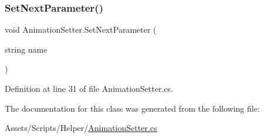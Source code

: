 \subsubsection{\texorpdfstring{Set\+Next\+Parameter()}{SetNextParameter()}}
{\footnotesize\ttfamily void Animation\+Setter.\+Set\+Next\+Parameter (\begin{DoxyParamCaption}\item[{string}]{name }\end{DoxyParamCaption})}



Definition at line 31 of file Animation\+Setter.\+cs.



The documentation for this class was generated from the following file\+:\begin{DoxyCompactItemize}
\item 
Assets/\+Scripts/\+Helper/\mbox{\hyperlink{_animation_setter_8cs}{Animation\+Setter.\+cs}}\end{DoxyCompactItemize}

